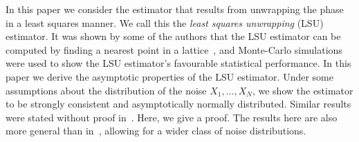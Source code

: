 \documentclass[aap]{imsart}
\begin{document}
In this paper we consider the estimator that results from unwrapping the phase in a least squares manner.  We call this the \emph{least squares unwrapping} (LSU) estimator.  It was shown by some of the authors \cite[Sec. 8.1]{McKilliam2010thesis}\cite{McKilliam2009asilomar_polyest_lattice} that the LSU estimator can be computed by finding a nearest point in a lattice~\cite{Agrell2002}, and Monte-Carlo simulations were used to show the LSU estimator's favourable statistical performance. %
In this paper we derive the asymptotic properties of the LSU estimator.  Under some assumptions about the distribution of the noise $X_1, \dots, X_N$, we show the estimator to be strongly consistent and asymptotically normally distributed.  Similar results were stated without proof in~\cite{McKilliam_polyphase_est_icassp_2011}.  Here, we give a proof.  The results here are also more general than in~\cite{McKilliam_polyphase_est_icassp_2011}, allowing for a wider class of noise distributions.
\end{document}
